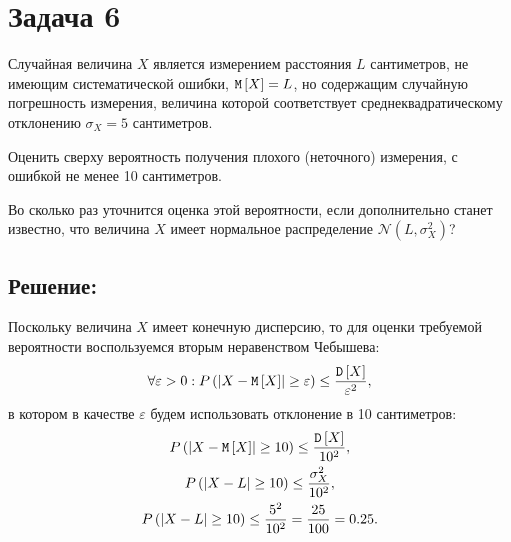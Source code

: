 \section*{Задача 6}

Случайная величина $X$ является измерением расстояния $L$ сантиметров, не имеющим систематической ошибки, $\mathtt{M} \left [ X \right ] = L$, но содержащим случайную погрешность
измерения, величина которой соответствует среднеквадратическому отклонению $\sigma_X = 5$ сантиметров.

Оценить сверху вероятность получения плохого (неточного) измерения, с ошибкой не менее 10 сантиметров.

Во сколько раз уточнится оценка этой вероятности, если дополнительно станет известно, что величина $X$ имеет нормальное распределение $\mathcal{N} ( L, \sigma_X^2)$?

\subsection*{Решение:}
Поскольку величина $X$ имеет конечную дисперсию, то для оценки требуемой вероятности воспользуемся вторым неравенством Чебышева:
\begin{equation}
    \forall \varepsilon > 0 : P \left (  \left | X - \mathtt{M} \left [ X \right ] \right | \ge \varepsilon  \right ) \le \frac{\mathtt{D} \left [ X \right ]}{\varepsilon^2} ,
\end{equation}
в котором в качестве $\varepsilon$ будем использовать отклонение в 10 сантиметров:
\begin{gather}
    P \left (  \left | X - \mathtt{M} \left [ X \right ] \right | \ge 10  \right ) \le \frac{\mathtt{D} \left [ X \right ]}{10^2} , \\
    P \left (  \left | X - L \right | \ge 10  \right ) \le \frac{\sigma_X^2}{10^2} , \\
    P \left (  \left | X - L \right | \ge 10  \right ) \le \frac{5^2}{10^2} = \frac{25}{100} = 0.25 \label{2:bound}.
\end{gather}

